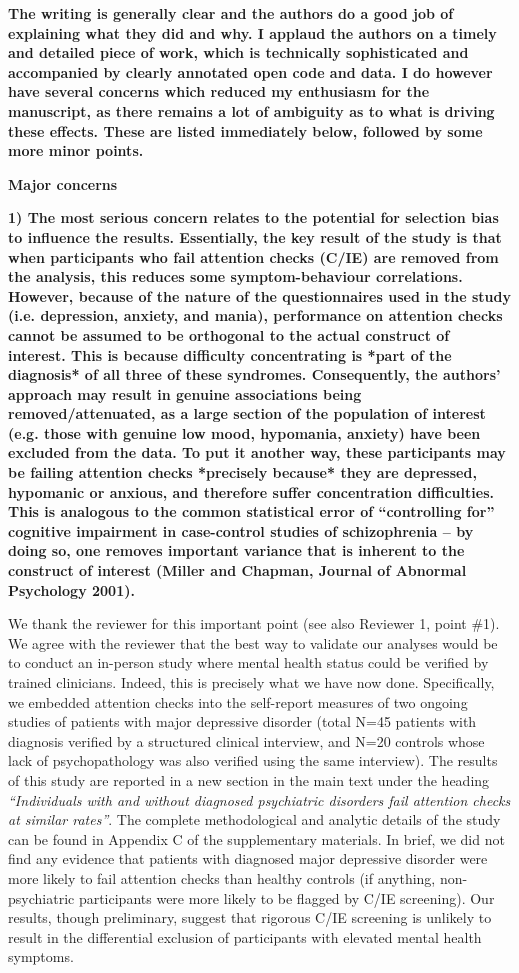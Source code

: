 \documentclass[a4paper,notitlepage,12pt]{article}
\begin{document}
\textbf{The writing is generally clear and the authors do a good job of explaining what they did and why. I applaud the authors on a timely and detailed piece of work, which is technically sophisticated and accompanied by clearly annotated open code and data. I do however have several concerns which reduced my enthusiasm for the manuscript, as there remains a lot of ambiguity as to what is driving these effects. These are listed immediately below, followed by some more minor points.}

\textbf{Major concerns}

\textbf{1) The most serious concern relates to the potential for selection bias to influence the results. Essentially, the key result of the study is that when participants who fail attention checks (C/IE) are removed from the analysis, this reduces some symptom-behaviour correlations. However, because of the nature of the questionnaires used in the study (i.e. depression, anxiety, and mania), performance on attention checks cannot be assumed to be orthogonal to the actual construct of interest. This is because difficulty concentrating is *part of the diagnosis* of all three of these syndromes. Consequently, the authors' approach may result in genuine associations being removed/attenuated, as a large section of the population of interest (e.g. those with genuine low mood, hypomania, anxiety) have been excluded from the data. To put it another way, these participants may be failing attention checks *precisely because* they are depressed, hypomanic or anxious, and therefore suffer concentration difficulties. This is analogous to the common statistical error of ``controlling for'' cognitive impairment in case-control studies of schizophrenia – by doing so, one removes important variance that is inherent to the construct of interest (Miller and Chapman, Journal of Abnormal Psychology 2001).}

We thank the reviewer for this important point (see also Reviewer 1, point \#1). We agree with the reviewer that the best way to validate our analyses would be to conduct an in-person study where mental health status could be verified by trained clinicians. Indeed, this is precisely what we have now done. Specifically, we embedded attention checks into the self-report measures of two ongoing studies of patients with major depressive disorder (total N=45 patients with diagnosis verified by a structured clinical interview, and N=20 controls whose lack of psychopathology was also verified using the same interview). The results of this study are reported in a new section in the main text under the heading \textit{``Individuals with and without diagnosed psychiatric disorders fail attention checks at similar rates''}. The complete methodological and analytic details of the study can be found in Appendix C of the supplementary materials. In brief, we did not find any evidence that patients with diagnosed major depressive disorder were more likely to fail attention checks than healthy controls (if anything, non-psychiatric participants were more likely to be flagged by C/IE screening). Our results, though preliminary, suggest that rigorous C/IE screening is unlikely to result in the differential exclusion of participants with elevated mental health symptoms.
\end{document}
